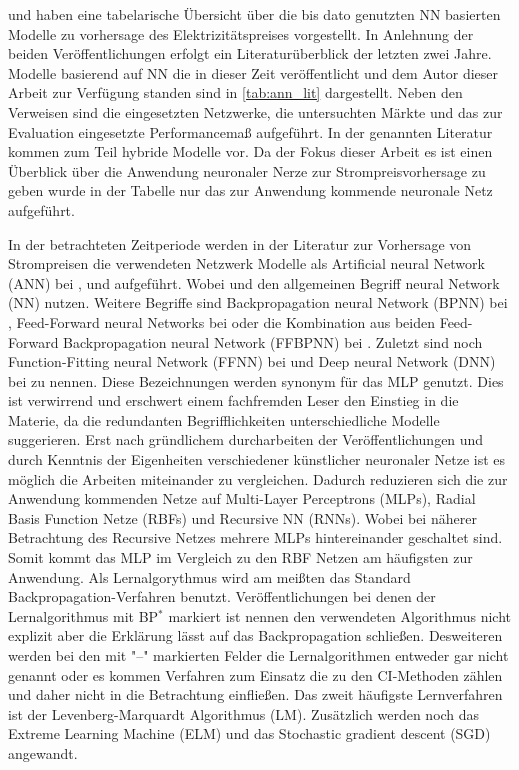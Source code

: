 \citet{Aggarwal2009} und \citet{Panapakidis2016} haben eine tabelarische Übersicht über die bis dato genutzten NN basierten Modelle zu vorhersage des Elektrizitätspreises vorgestellt. In Anlehnung der beiden Veröffentlichungen erfolgt ein Literaturüberblick der letzten zwei Jahre. 
Modelle basierend auf NN die in dieser Zeit veröffentlicht und dem Autor dieser Arbeit zur Verfügung standen sind in \autoref{tab:ann_lit} dargestellt. Neben den Verweisen sind die eingesetzten Netzwerke, die untersuchten Märkte und das zur Evaluation eingesetzte Performancemaß aufgeführt. In der genannten Literatur kommen zum Teil hybride Modelle vor. Da der Fokus dieser Arbeit es ist einen Überblick über die Anwendung neuronaler Nerze zur Strompreisvorhersage zu geben wurde in der Tabelle nur das zur Anwendung kommende neuronale Netz aufgeführt. 






In der betrachteten Zeitperiode werden in der Literatur zur Vorhersage von Strompreisen die verwendeten Netzwerk Modelle als Artificial neural Network (ANN) bei \citet{Mirakyan2017}, \citet{Gao2017} und \citet{Sandhu2016} aufgeführt. Wobei \citet{Davo2016} und \citet{Domanski2017} den allgemeinen Begriff neural Network (NN) nutzen. Weitere Begriffe sind Backpropagation neural Network (BPNN) bei \citet{Wang2017}, Feed-Forward neural Networks bei \citet{Keles2016} oder die Kombination aus beiden Feed-Forward Backpropagation neural Network (FFBPNN) bei \citet{Peter2016}. Zuletzt sind noch Function-Fitting neural Network (FFNN) bei \citet{Marcos2017} und Deep neural Network (DNN) bei \citet{Lago2018} zu nennen. Diese Bezeichnungen werden synonym für das MLP genutzt. Dies ist verwirrend und erschwert einem fachfremden Leser den Einstieg in die Materie, da die redundanten Begrifflichkeiten unterschiedliche Modelle suggerieren. Erst nach gründlichem durcharbeiten der Veröffentlichungen und durch Kenntnis der Eigenheiten verschiedener künstlicher neuronaler Netze ist es möglich die Arbeiten miteinander zu vergleichen. Dadurch reduzieren sich die zur Anwendung kommenden Netze auf Multi-Layer Perceptrons (MLPs), Radial Basis Function Netze (RBFs) und Recursive NN (RNNs). Wobei bei näherer Betrachtung des Recursive Netzes mehrere MLPs hintereinander geschaltet sind. Somit kommt das MLP im Vergleich zu den RBF Netzen am häufigsten zur Anwendung. Als Lernalgorythmus wird am meißten das Standard Backpropagation-Verfahren benutzt. Veröffentlichungen bei denen der Lernalgorithmus mit BP$^{*}$ markiert ist nennen den verwendeten Algorithmus nicht explizit aber die Erklärung lässt auf das Backpropagation schließen. Desweiteren werden bei den mit "--" markierten Felder die Lernalgorithmen entweder gar nicht genannt oder es kommen Verfahren zum Einsatz die zu den CI-Methoden zählen und daher nicht in die Betrachtung einfließen. Das zweit häufigste Lernverfahren ist der Levenberg-Marquardt Algorithmus (LM). Zusätzlich werden noch das Extreme Learning Machine (ELM) und das Stochastic gradient descent (SGD) angewandt. 

